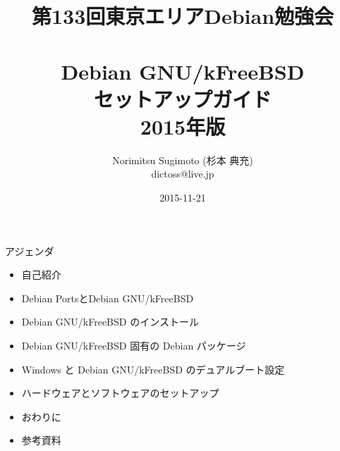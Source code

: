 \title{第133回東京エリアDebian勉強会 \\　\\Debian GNU/kFreeBSD\\セットアップガイド\\2015年版}
\subtitle{}
\author{Norimitsu Sugimoto (杉本 典充) \\dictoss@live.jp}
\date{2015-11-21}



\frame{\titlepage{}}


\begin{frame}{アジェンダ}
  \begin{itemize}
  \item 自己紹介
  \item Debian PortsとDebian GNU/kFreeBSD
  \item Debian GNU/kFreeBSD のインストール
  \item Debian GNU/kFreeBSD 固有の Debian パッケージ
  \item Windows と Debian GNU/kFreeBSD のデュアルブート設定
  \item ハードウェアとソフトウェアのセットアップ
  \item おわりに
  \item 参考資料
  \end{itemize}
\end{frame}

